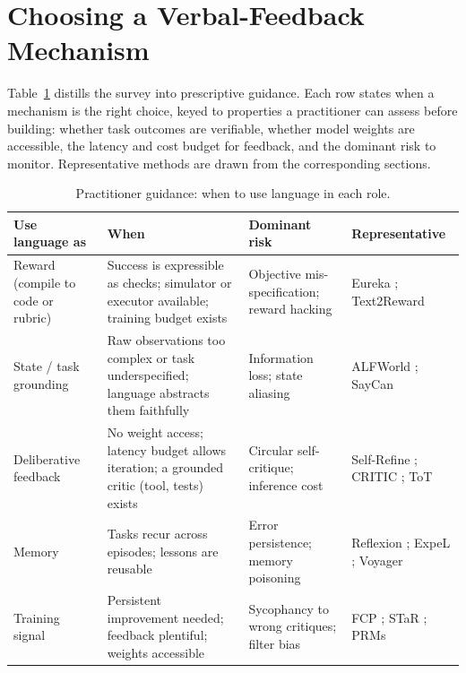\section{Choosing a Verbal-Feedback Mechanism}
\label{app:guide}
{\ifmarkup\color{red}\fi
Table~\ref{tab:guide} distills the survey into prescriptive guidance. Each row states when a mechanism is the right choice, keyed to properties a practitioner can assess before building: whether task outcomes are verifiable, whether model weights are accessible, the latency and cost budget for feedback, and the dominant risk to monitor. Representative methods are drawn from the corresponding sections.

\widefloatnonumbers
\begin{table}[t]
    \centering
    \footnotesize
    \renewcommand{\arraystretch}{1.2}
    \caption{Practitioner guidance: when to use language in each role.}
    \label{tab:guide}
    \begin{tabularx}{\textwidth}{@{} >{\raggedright\arraybackslash}p{} >{\raggedright\arraybackslash}X >{\raggedright\arraybackslash}p{} >{\raggedright\arraybackslash}p{} @{}}
        \toprule
        \textbf{Use language as} & \textbf{When} & \textbf{Dominant risk} & \textbf{Representative} \\
        \midrule
        Reward (compile to code or rubric) & Success is expressible as checks; simulator or executor available; training budget exists & Objective mis-specification; reward hacking & Eureka \citep{ma2024eureka}; Text2Reward \citep{xie2024text2reward} \\
        State / task grounding & Raw observations too complex or task underspecified; language abstracts them faithfully & Information loss; state aliasing & ALFWorld \citep{shridhar2020alfworld}; SayCan \citep{ahn2022can} \\
        Deliberative feedback & No weight access; latency budget allows iteration; a grounded critic (tool, tests) exists & Circular self-critique; inference cost & Self-Refine \citep{madaan2023selfrefine}; CRITIC \citep{gou2024critic}; ToT \citep{yao2023tree} \\
        Memory & Tasks recur across episodes; lessons are reusable & Error persistence; memory poisoning & Reflexion \citep{shinn2023reflexion}; ExpeL \citep{zhao2024expel}; Voyager \citep{wang2023voyager} \\
        Training signal & Persistent improvement needed; feedback plentiful; weights accessible & Sycophancy to wrong critiques; filter bias & FCP \citep{luo2025fcp}; STaR \citep{zelikman2022star}; PRMs \citep{lightman2024let} \\
        \bottomrule
    \end{tabularx}
\end{table}
\widefloatresumenumbers
}
